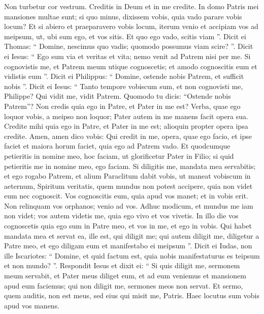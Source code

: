 \begin{biblechapter}
\begin{biblechapter}
\begin{biblechapter}
\begin{biblechapter}
\begin{biblechapter}
\begin{biblechapter}
\begin{biblechapter}
\begin{biblechapter}
\begin{biblechapter}
\begin{biblechapter}
\begin{biblechapter}
\begin{biblechapter}
\begin{biblechapter}
\begin{biblechapter}
\verse Non turbetur cor vestrum. Creditis in Deum et in me credite. 
\verse In domo Patris mei mansiones multae sunt; si quo minus, dixissem vobis, quia vado parare vobis locum? 
\verse Et si abiero et praeparavero vobis locum, iterum venio et accipiam vos ad meipsum, ut, ubi sum ego, et vos sitis. 
\verse Et quo ego vado, scitis viam ”.
 \verse Dicit ei Thomas: “ Domine, nescimus quo vadis; quomodo possumus viam scire? ”. 
 \verse Dicit ei Iesus: “ Ego sum via et veritas et vita; nemo venit ad Patrem nisi per me. 
\verse Si cognovistis me, et Patrem meum utique cognoscetis; et amodo cognoscitis eum et vidistis eum ”. 
\verse Dicit ei Philippus: “ Domine, ostende nobis Patrem, et sufficit nobis ”. 
\verse Dicit ei Iesus: “ Tanto tempore vobiscum sum, et non cognovisti me, Philippe? Qui vidit me, vidit Patrem. Quomodo tu dicis: “Ostende nobis Patrem”? 
\verse Non credis quia ego in Patre, et Pater in me est? Verba, quae ego loquor vobis, a meipso non loquor; Pater autem in me manens facit opera sua. 
\verse Credite mihi quia ego in Patre, et Pater in me est; alioquin propter opera ipsa credite.
 \verse Amen, amen dico vobis: Qui credit in me, opera, quae ego facio, et ipse faciet et maiora horum faciet, quia ego ad Patrem vado. 
\verse Et quodcumque petieritis in nomine meo, hoc faciam, ut glorificetur Pater in Filio; 
\verse si quid petieritis me in nomine meo, ego faciam.
 \verse Si diligitis me, mandata mea servabitis; 
\verse et ego rogabo Patrem, et alium Paraclitum dabit vobis, ut maneat vobiscum in aeternum, 
\verse Spiritum veritatis, quem mundus non potest accipere, quia non videt eum nec cognoscit. Vos cognoscitis eum, quia apud vos manet; et in vobis erit. 
\verse Non relinquam vos orphanos; venio ad vos. 
\verse Adhuc modicum, et mundus me iam non videt; vos autem videtis me, quia ego vivo et vos vivetis. 
\verse In illo die vos cognoscetis quia ego sum in Patre meo, et vos in me, et ego in vobis. 
\verse Qui habet mandata mea et servat ea, ille est, qui diligit me; qui autem diligit me, diligetur a Patre meo, et ego diligam eum et manifestabo ei meipsum ”.
 \verse Dicit ei Iudas, non ille Iscariotes: “ Domine, et quid factum est, quia nobis manifestaturus es teipsum et non mundo? ”. 
\verse Respondit Iesus et dixit ei: “ Si quis diligit me, sermonem meum servabit, et Pater meus diliget eum, et ad eum veniemus et mansionem apud eum faciemus; 
\verse qui non diligit me, sermones meos non servat. Et sermo, quem auditis, non est meus, sed eius qui misit me, Patris.
 \verse Haec locutus sum vobis apud vos manens. 

\end{biblechapter}
\end{biblechapter}
\end{biblechapter}
\end{biblechapter}
\end{biblechapter}
\end{biblechapter}
\end{biblechapter}
\end{biblechapter}
\end{biblechapter}
\end{biblechapter}
\end{biblechapter}
\end{biblechapter}
\end{biblechapter}
\end{biblechapter}
